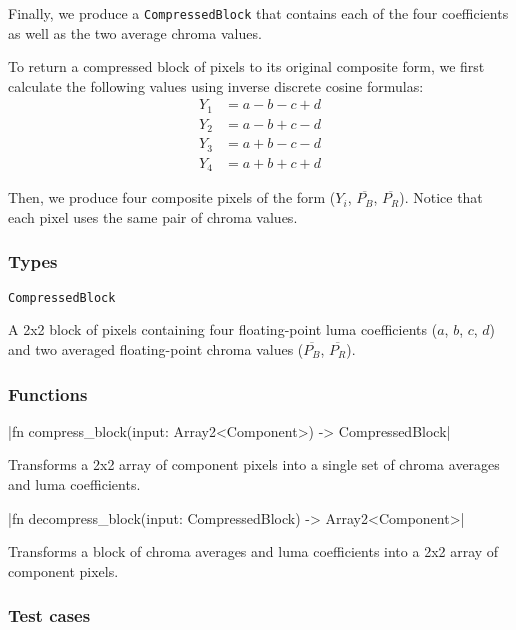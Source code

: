 \documentclass[12pt, letterpaper]{article}
\begin{document}
    Finally, we produce a \verb|CompressedBlock| that contains each of the four coefficients as well as the two
    average chroma values.

    To return a compressed block of pixels to its original composite form, we first calculate the following values
    using inverse discrete cosine formulas:
    \begin{align*}
        Y_1 &= a - b - c + d \\
        Y_2 &= a - b + c - d \\
        Y_3 &= a + b - c - d \\
        Y_4 &= a + b + c + d
    \end{align*}

    Then, we produce four composite pixels of the form ($Y_i$, $\overline{P_B}$, $\overline{P_R}$).
    Notice that each pixel uses the same pair of chroma values.

    \subsubsection{Types}

    \verb|CompressedBlock|

    A 2x2 block of pixels containing four floating-point luma coefficients ($a$, $b$, $c$, $d$) and two averaged
    floating-point chroma values ($\overline{P_B}$, $\overline{P_R}$).

    \subsubsection{Functions}

    |fn compress_block(input: Array2<Component>) -> CompressedBlock|

    Transforms a 2x2 array of component pixels into a single set of chroma averages and luma coefficients.

    |fn decompress_block(input: CompressedBlock) -> Array2<Component>|

    Transforms a block of chroma averages and luma coefficients into a 2x2 array of component pixels.

    \subsubsection{Test cases}
\end{document}
